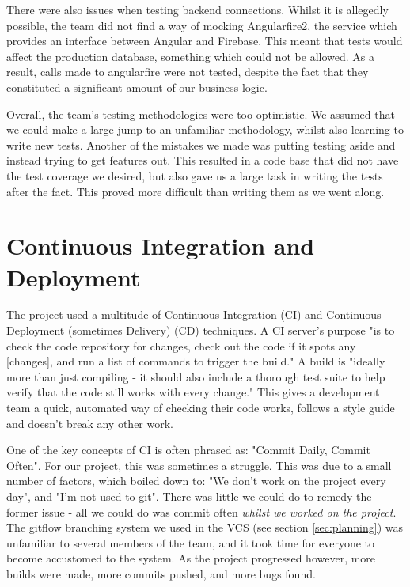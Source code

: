 \documentclass{l3proj}
\begin{document}
There were also issues when testing backend connections. Whilst it is
 allegedly possible, the team did not find a way of mocking Angularfire2, the
 service which provides an interface between Angular and Firebase. This meant
 that tests would affect the production database, something which could not be
 allowed. As a result, calls made to angularfire were not tested, despite the
 fact that they constituted a significant amount of our business logic.

Overall, the team's testing methodologies were too optimistic. We assumed that
 we could make a large jump to an unfamiliar methodology, whilst also learning
 to write new tests. Another of the mistakes we made was putting testing aside
 and instead trying to get features out. This resulted in a code base that did
 not have the test coverage we desired, but also gave us a large task in writing
 the tests after the fact. This proved more difficult than writing them as we
 went along.

 

\section{Continuous Integration and Deployment} %
\label{sec:cicd}

The project used a multitude of Continuous Integration (CI) and Continuous
 Deployment (sometimes Delivery) (CD) techniques. A CI server's purpose "is to check the code
 repository for changes, check out the code if it spots any [changes], and run a
 list of commands to trigger the build."\cite{meyer2014continuous} A build is "ideally more than just
 compiling - it should also include a thorough test suite to help verify that the code
 still works with every change."\cite{meyer2014continuous} This gives a development
 team a quick, automated way of checking their code works, follows a style guide and
 doesn't break any other work.

One of the key concepts of CI is often phrased as: "Commit Daily,
 Commit Often"\cite{meyer2014continuous}. For our project, this was sometimes a struggle.
 This was due to a small number of factors, which boiled down to: "We don't work on the project
 every day", and "I'm not used to git". There was little we could do to remedy the former issue -
 all we could do was commit often \textit{whilst we worked on the project}. The gitflow
 branching system we used in the VCS (see section \ref{sec:planning}) was unfamiliar to several
 members of the team, and it took time for everyone to become accustomed to the system. As the
 project progressed however, more builds were made, more commits pushed, and more bugs found.
\end{document}
